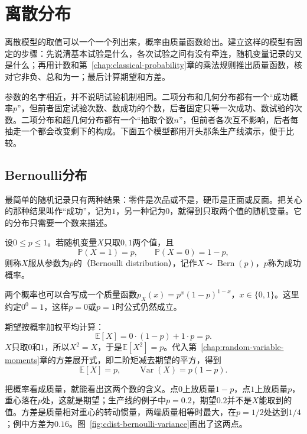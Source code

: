 \section{离散分布}
\label{sec:cdist-discrete}

离散模型的取值可以一个一个列出来，概率由质量函数给出。建立这样的模型有固定的步骤：先说清基本试验是什么，各次试验之间有没有牵连，随机变量记录的又是什么；再用计数和第~\ref{chap:classical-probability}章的乘法规则推出质量函数，核对它非负、总和为一；最后计算期望和方差。

参数的名字相近，并不说明试验机制相同。二项分布和几何分布都有一个“成功概率$p$”，但前者固定试验次数、数成功的个数，后者固定只等一次成功、数试验的次数。二项分布和超几何分布都有一个“抽取个数$n$”，但前者各次互不影响，后者每抽走一个都会改变剩下的构成。下面五个模型都用开头那条生产线演示，便于比较。

\subsection{Bernoulli分布}
\label{sec:cdist-bernoulli}

最简单的随机记录只有两种结果：零件是次品或不是，硬币是正面或反面。把关心的那种结果叫作“成功”，记为$1$，另一种记为$0$，就得到只取两个值的随机变量。它的分布只需要一个数来描述。

\begin{definition}[Bernoulli分布]
\label{def:cdist-bernoulli}
设$0\leq p\leq1$。若随机变量$X$只取$0,1$两个值，且
\begin{equation}
  \mathbb{P}(X=1)=p,\qquad \mathbb{P}(X=0)=1-p,
  \label{eq:cdist-bernoulli-pmf}
\end{equation}
则称$X$服从参数为$p$的（Bernoulli distribution），记作$X\sim\operatorname{Bern}(p)$，$p$称为成功概率。
\end{definition}

两个概率也可以合写成一个质量函数$p_X(x)=p^{x}(1-p)^{1-x}$，$x\in\{0,1\}$。这里约定$0^{0}=1$，这样$p=0$或$p=1$时公式仍然成立。

期望按概率加权平均计算：
\[
  \mathbb{E}[X]=0\cdot(1-p)+1\cdot p=p .
\]
$X$只取$0$和$1$，所以$X^{2}=X$，于是$\mathbb{E}[X^{2}]=p$。代入第~\ref{chap:random-variable-moments}章的方差展开式，即二阶矩减去期望的平方，得到
\begin{equation}
  \mathbb{E}[X]=p,\qquad \operatorname{Var}(X)=p(1-p).
  \label{eq:cdist-bernoulli-moments}
\end{equation}

把概率看成质量，就能看出这两个数的含义。点$0$上放质量$1-p$，点$1$上放质量$p$，重心落在$p$处，这就是期望；生产线的例子中$p=0.2$，期望$0.2$并不是$X$能取到的值。方差是质量相对重心的转动惯量，两端质量相等时最大，在$p=1/2$处达到$1/4$；例中方差为$0.16$。图~\ref{fig:cdist-bernoulli-variance}画出了这两点。

